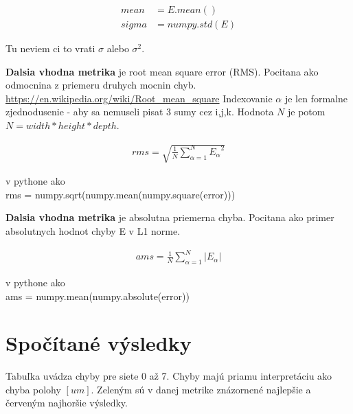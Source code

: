 \documentclass[10pt,a4paper]{article}
\begin{document}
\begin{align}
mean    &= E.mean() \\
sigma   &= numpy.std(E)
\end{align}

Tu neviem ci to vrati $\sigma$ alebo $\sigma^2$.


{\bf Dalsia vhodna metrika} je root mean square error (RMS). Pocitana
ako odmocnina z priemeru druhych mocnin chyb. \url{https://en.wikipedia.org/wiki/Root_mean_square}
Indexovanie $\alpha$ je len formalne zjednodusenie - aby sa nemuseli pisat 3 sumy
cez i,j,k. Hodnota $N$ je potom $N = width*height*depth$.

\begin{align}
rms = \sqrt{\frac{1}{N}\sum_{\alpha=1}^{N}{E_\alpha}^2}
\end{align}

v pythone ako\\
rms                 = numpy.sqrt(numpy.mean(numpy.square(error)))



{\bf Dalsia vhodna metrika} je absolutna priemerna chyba. Pocitana ako
primer absolutnych hodnot chyby E v L1 norme.


\begin{align}
ams = \frac{1}{N}\sum_{\alpha=1}^{N}|E_\alpha|
\end{align}

v pythone ako\\
ams      =  numpy.mean(numpy.absolute(error))

\newpage

\section{Spočítané výsledky}

Tabuľka uvádza chyby pre siete 0 až 7.
Chyby majú priamu interpretáciu ako chyba polohy $[um]$.
Zeleným sú v danej metrike znázornené najlepšie a červeným najhoršie výsledky.
\end{document}
